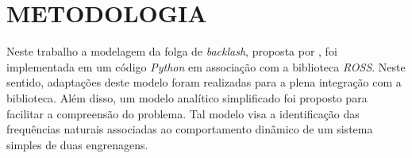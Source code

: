 \newpage
\chapter{\normalsize{METODOLOGIA}} \label{cap:metodologia}

\thispagestyle{empty}


Neste trabalho a modelagem da folga de \textit{backlash}, proposta por , foi implementada em um código \textit{Python} em associação com a biblioteca \textit{ROSS}. Neste sentido, adaptações deste modelo foram realizadas para a plena integração com a  biblioteca. Além disso, um modelo analítico simplificado foi proposto para facilitar a compreensão do problema. Tal modelo visa a identificação das frequências naturais associadas ao comportamento dinâmico de um sistema simples de duas engrenagens.
	
%
%





